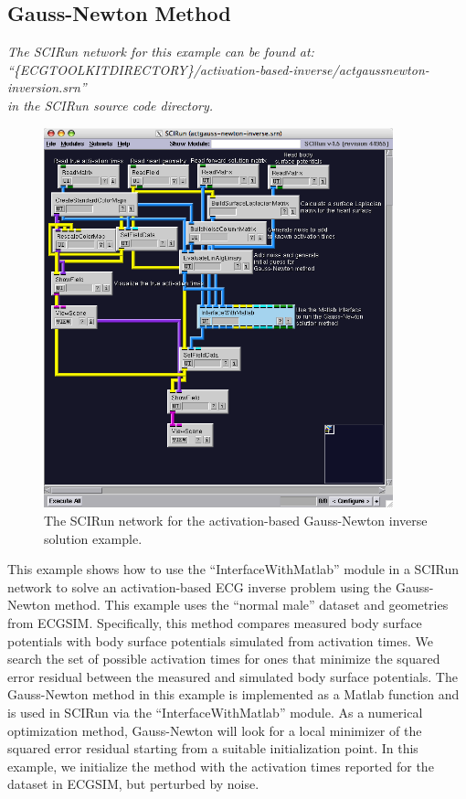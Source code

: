 \subsection{Gauss-Newton Method}

\vspace{5pt}\textit{The SCIRun network for this example can be found at:\\``\{ECGTOOLKITDIRECTORY\}/activation-based-inverse/actgaussnewton-inversion.srn''\\in the SCIRun source code directory.}\vspace{5pt}

\begin{figure}[H]
\begin{center}
\includegraphics[width=0.9\textwidth]{ECGToolkitGuide_figures/actgaussnewtonnetwork.png}
\caption{The SCIRun network for the activation-based Gauss-Newton inverse solution example.}
\label{GaussNewtonNetworkExample}
\end{center}
\end{figure}

This example shows how to use the ``InterfaceWithMatlab'' module in a SCIRun network to solve an activation-based ECG inverse problem using the Gauss-Newton method. This example uses the ``normal male'' dataset and geometries from ECGSIM. Specifically, this method compares measured body surface potentials with body surface potentials simulated from activation times. We search the set of possible activation times for ones that minimize the squared error residual between the measured and simulated body surface potentials. The Gauss-Newton method in this example is implemented as a Matlab function and is used in SCIRun via the ``InterfaceWithMatlab'' module. As a numerical optimization method, Gauss-Newton will look for a local minimizer of the squared error residual starting from a suitable initialization point. In this example, we initialize the method with the activation times reported for the dataset in ECGSIM, but perturbed by noise.

